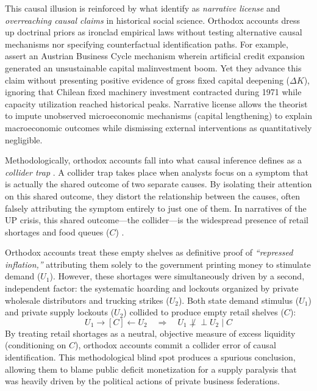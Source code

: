 This causal illusion is reinforced by what \citet{IschEtAl2026} identify as \emph{narrative license} and \emph{overreaching causal claims} in historical social science. Orthodox accounts dress up doctrinal priors as ironclad empirical laws without testing alternative causal mechanisms nor specifying counterfactual identification paths. For example, \citet{EspinosaVejar2025} assert an Austrian Business Cycle mechanism wherein artificial credit expansion generated an unsustainable capital malinvestment boom. Yet they advance this claim without presenting positive evidence of gross fixed capital deepening ($\Delta K$), ignoring that Chilean fixed machinery investment contracted during 1971 while capacity utilization reached historical peaks. Narrative license allows the theorist to impute unobserved microeconomic mechanisms (capital lengthening) to explain macroeconomic outcomes while dismissing external interventions as quantitatively negligible.

Methodologically, orthodox accounts fall into what causal inference defines as a \emph{collider trap} \citep{Pearl2009}. A collider trap takes place when analysts focus on a symptom that is actually the shared outcome of two separate causes. By isolating their attention on this shared outcome, they distort the relationship between the causes, often falsely attributing the symptom entirely to just one of them. In narratives of the UP crisis, this shared outcome---the collider---is the widespread presence of retail shortages and food queues ($C$) \citep{Edwards2024}. 

Orthodox accounts treat these empty shelves as definitive proof of \textit{``repressed inflation,''} attributing them solely to the government printing money to stimulate demand ($U_1$). However, these shortages were simultaneously driven by a second, independent factor: the systematic hoarding and lockouts organized by private wholesale distributors and trucking strikes ($U_2$). Both state demand stimulus ($U_1$) and private supply lockouts ($U_2$) collided to produce empty retail shelves ($C$):
\begin{equation}
	U_1 \longrightarrow [C] \longleftarrow U_2 \quad \Longrightarrow \quad U_1 \not\perp\!\!\!\perp U_2 \mid C
\end{equation}
By treating retail shortages as a neutral, objective measure of excess liquidity (conditioning on $C$), orthodox accounts commit a collider error of causal identification. This methodological blind spot produces a spurious conclusion, allowing them to blame public deficit monetization for a supply paralysis that was heavily driven by the political actions of private business federations.

